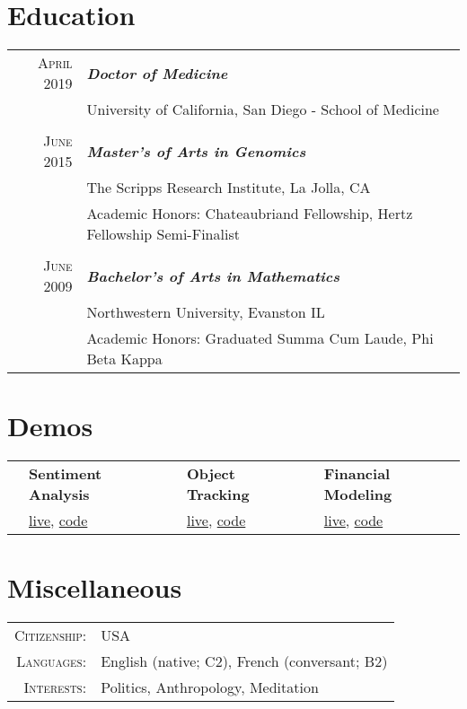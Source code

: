 \documentclass{article}
\begin{document}
\section{Education}
\begin{tabular}{r | p{11cm}}	

\raggedleft \textsc{April} 2019 & \emph{\textbf{Doctor of Medicine}} \\ 
\raggedleft & University of California, San Diego - School of Medicine \\

 \multicolumn{2}{c}{} \\

\raggedleft \textsc{June} 2015 & \emph{\textbf{Master's of Arts in Genomics}} \\ 
  & The Scripps Research Institute, La Jolla, CA\\
  & Academic Honors: Chateaubriand Fellowship, Hertz Fellowship Semi-Finalist \\

  \multicolumn{2}{c}{} \\

\raggedleft \textsc{June} 2009 & \emph{\textbf{Bachelor's of Arts in Mathematics}} \\ 
  & Northwestern University, Evanston IL\\
  & Academic Honors: Graduated Summa Cum Laude, Phi Beta Kappa \\
\end{tabular}


\section{Demos}

	\begin{tabular}{r p{4cm} r p{4cm} r p{4cm} }
	
		\multirow{2}{*}{\Huge \color{starcolor}{\faSmileO}} &
		\textbf{Sentiment Analysis} & 
		\multirow{2}{*}{\Huge \color{starcolor}{\faRocket}} &
		\textbf{Object Tracking} &
		\multirow{2}{*}{\Huge \color{starcolor}{\faLineChart }} &
		\textbf{Financial Modeling}\\
		
		&
		\href{https://erickramer.live/sentiment/}{live}, \href{https://github.com/erickramer/sentiment}{code} & &
		\href{https://erickramer.live/asteroids}{live}, \href{https://github.com/erickramer/personal_site_flask/blob/master/elm/Asteroids.elm}{code} & &
		\href{https://eransom.shinyapps.io/financial_planning/}{live}, \href{https://github.com/erickramer/financial_dashboard}{code} \\	

		
	\end{tabular}

\section{Miscellaneous}

	\begin{tabular}{r l}
		\textsc{Citizenship}: & USA \\
		\textsc{Languages}: &  English (native; C2), French (conversant; B2)\\
		\textsc{Interests}: & Politics, Anthropology, Meditation
	\end{tabular}
\end{document}
